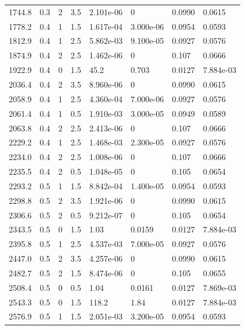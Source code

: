 \documentclass[preview]{standalone}
\begin{document}
{{{\begin{tabular}{L{1.2cm}C{1.2cm} C{0.3cm}C{0.5cm} C{1.4cm}C{1.4cm} C{1.4cm}C{1.4cm}}
  1744.8  &   0.3  & 2     & 3.5 &  2.101e-06  & 0  & 0.0990 &  0.0615   \\ 
  1778.2  &   0.4  & 1     & 1.5 &  1.617e-04  & 3.000e-06  & 0.0954 &  0.0593   \\ 
  1812.9  &   0.4  & 1     & 2.5 &  5.862e-03  & 9.100e-05  & 0.0927 &  0.0576   \\ 
  1874.9  &   0.4  & 2     & 2.5 &  1.462e-06  & 0  & 0.107 &  0.0666   \\ 
  1922.9  &   0.4  & 0     & 1.5 &  45.2  & 0.703  & 0.0127 &  7.884e-03   \\ 
  2036.4  &   0.4  & 2     & 3.5 &  8.960e-06  & 0  & 0.0990 &  0.0615   \\ 
  2058.9  &   0.4  & 1     & 2.5 &  4.360e-04  & 7.000e-06  & 0.0927 &  0.0576   \\ 
  2061.4  &   0.4  & 1     & 0.5 &  1.910e-03  & 3.000e-05  & 0.0949 &  0.0589   \\ 
  2063.8  &   0.4  & 2     & 2.5 &  2.413e-06  & 0  & 0.107 &  0.0666   \\ 
  2229.2  &   0.4  & 1     & 2.5 &  1.468e-03  & 2.300e-05  & 0.0927 &  0.0576   \\ 
  2234.0  &   0.4  & 2     & 2.5 &  1.008e-06  & 0  & 0.107 &  0.0666   \\ 
  2235.5  &   0.4  & 2     & 0.5 &  1.048e-05  & 0  & 0.105 &  0.0654   \\ 
  2293.2  &   0.5  & 1     & 1.5 &  8.842e-04  & 1.400e-05  & 0.0954 &  0.0593   \\ 
  2298.8  &   0.5  & 2     & 3.5 &  1.921e-06  & 0  & 0.0990 &  0.0615   \\ 
  2306.6  &   0.5  & 2     & 0.5 &  9.212e-07  & 0  & 0.105 &  0.0654   \\ 
  2343.5  &   0.5  & 0     & 1.5 &  1.03  & 0.0159  & 0.0127 &  7.884e-03   \\ 
  2395.8  &   0.5  & 1     & 2.5 &  4.537e-03  & 7.000e-05  & 0.0927 &  0.0576   \\ 
  2447.0  &   0.5  & 2     & 3.5 &  4.257e-06  & 0  & 0.0990 &  0.0615   \\ 
  2482.7  &   0.5  & 2     & 1.5 &  8.474e-06  & 0  & 0.105 &  0.0655   \\ 
  2508.4  &   0.5  & 0     & 0.5 &  1.04  & 0.0161  & 0.0127 &  7.869e-03   \\ 
  2543.3  &   0.5  & 0     & 1.5 &  118.2  & 1.84  & 0.0127 &  7.884e-03   \\ 
  2576.9  &   0.5  & 1     & 1.5 &  2.051e-03  & 3.200e-05  & 0.0954 &  0.0593   \\ 

\end{tabular}}}}
\end{document}
